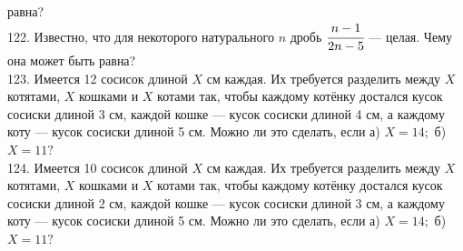 \documentclass[12pt]{article}
\begin{document}
равна?\\
122. Известно, что для некоторого натурального $n$ дробь $\cfrac{n - 1}{2n - 5}$ --- целая. Чему она может быть
равна?\\
123. Имеется 12 сосисок длиной $X$ см каждая. Их требуется разделить между $X$ котятами, $X$ кошками и $X$ котами так, чтобы каждому котёнку достался кусок сосиски длиной 3 см, каждой кошке ---
кусок сосиски длиной 4 см, а каждому коту --- кусок сосиски длиной 5 см. Можно ли это сделать, если а) $X = 14;$ б) $X = 11?$\\
124. Имеется 10 сосисок длиной $X$ см каждая. Их требуется разделить между $X$ котятами, $X$ кошками и $X$ котами так, чтобы каждому котёнку достался кусок сосиски длиной 2 см, каждой кошке ---
кусок сосиски длиной 3 см, а каждому коту --- кусок сосиски длиной 5 см. Можно ли это сделать, если а) $X = 14;$ б) $X = 11?$
\newpage
\end{document}
